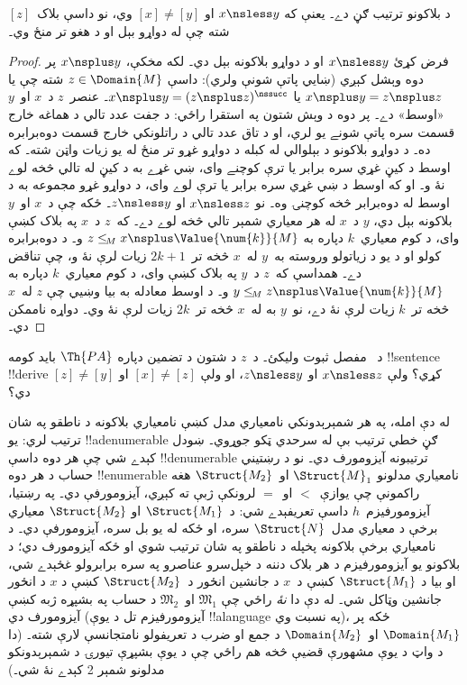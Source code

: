 \documentclass[../../../include/open-logic-section]{subfiles}
\begin{document}
\begin{prop}
د بلاکونو ترتيب ګڼ دے۔ يعنې که $x\nsless y$ او $[x]\neq[y]$ وي،
نو داسې بلاک~$[z]$ شته چې له دواړو بېل او د هغو تر منځ وي۔
\end{prop}

\begin{proof}
فرض کړئ $x\nsless y$ او د دواړو بلاکونه بېل دي۔ لکه مخکې، $x\nsplus y$ پر دوه وېشل کېږي
(ښايي پاتې شونې ولري): داسې $z\in\Domain{M}$ شته چې يا
$x \nsplus y = z \nsplus z$ يا
$x \nsplus y = (z \nsplus z)^\nssucc$۔ عنصر~$z$ د~$x$ او~$y$
«اوسط» دے۔ پر دوه د وېش شتون په استقرا راځي: د جفت عدد تالي د هماغه خارج قسمت سره پاتې شونے يو لري، او د تاق عدد تالي د راتلونکي خارج قسمت دوه‌برابره ده۔ د دواړو بلاکونو د بېلوالي له کبله د دواړو غړو تر منځ له يو زيات واټن شته۔ که اوسط د کيڼ غړي سره برابر يا ترې کوچنے وای، ښي غړے به د کيڼ له تالي څخه لوے نۀ و۔ او که اوسط د ښي غړي سره برابر يا ترې لوے وای، د دواړو غړو مجموعه به د اوسط له دوه‌برابر څخه کوچنۍ وه۔ نو $x\nsless z$ او $z\nsless y$۔ ځکه چې د~$x$ او~$y$ بلاکونه بېل دي، $y$ د~$x$ له هر معياري شمېر تالي څخه لوے دے۔ که~$z$ د~$x$ په بلاک کښې وای، د کوم معياري~$k$ دپاره به $z \mathrel{\leq_{\!M}} x \nsplus \Value{\num{k}}{M}$ و۔ د دوه‌برابره کولو او د يو د زياتولو وروسته به~$y$ له~$x$ څخه تر~$2k+1$ زيات لرې نۀ و، چې تناقض دے۔ همداسې که~$z$ د~$y$ په بلاک کښې وای، د کوم معياري~$k$ دپاره به $y \mathrel{\leq_{\!M}} z \nsplus \Value{\num{k}}{M}$ و۔ د اوسط معادله به بيا وښيي چې $z$ له~$x$ څخه تر~$k$ زيات لرې نۀ دے، نو~$y$ به له~$x$ څخه تر~$2k$ زيات لرې نۀ وي۔ دواړه ناممکن دي۔
\end{proof}

\begin{prob}
د~ مفصل ثبوت وليکئ۔
د~$z$ د شتون د تضمين دپاره $\Th{PA}$ بايد کومه !!{sentence}
!!{derive} کړي؟ ولې $x\nsless z$ او $z\nsless y$، او ولې
$[x]\neq[z]$ او $[z]\neq[y]$ دي؟
\end{prob}

\begin{explain}
له دې امله، په هر شمېرېدونکي نامعياري مدل کښې نامعياري بلاکونه د
ناطقو په شان ترتيب لري: يو !!a{denumerable} ګڼ خطي ترتيب بې له
سرحدي ټکو جوړوي۔ ښودل کېدے شي چې هر دوه داسې !!{denumerable}
ترتيبونه آيزومورف دي۔ نو د رښتيني حساب د هر دوه !!{enumerable}
نامعياري مدلونو $\Struct{M}_1$ او~$\Struct{M_2}$ هغه راکمونې چې
يوازې~$<$ او~$=$ لرونکې ژبې ته کېږي، آيزومورفې دي۔ په رښتيا،
آيزومورفيزم~$h$ داسې تعريفېدے شي: د~$\Struct{M_1}$ او
$\Struct{M_2}$ معياري برخې د معياري مدل~$\Struct{N}$ سره، او ځکه له
يو بل سره، آيزومورفې دي۔ د نامعياري برخې بلاکونه پخپله د ناطقو په
شان ترتيب شوي او ځکه آيزومورف دي؛ د بلاکونو يو آيزومورفيزم د هر
بلاک دننه د خپل‌سرو عناصرو په سره برابرولو غځېدے شي، او بيا د
$\Struct{M_1}$ کښې د~$x$ د جانشين انځور د~$\Struct{M_2}$ کښې د
$x$ د انځور جانشين وټاکل شي۔ له دې دا \emph{نۀ} راځي چې
$\mathfrak{M}_1$ او~$\mathfrak{M}_2$ د حساب په بشپړه ژبه کښې
آيزومورف دي (آيزومورفيزم تل د يوې !!a{language} په نسبت وي)، ځکه پر
$\Domain{M_1}$ او~$\Domain{M_2}$ د جمع او ضرب د تعريفولو نامتجانسې
لارې شته۔ (دا د واټ د يوې مشهورې قضيې څخه هم راځي چې د يوې بشپړې
تيورۍ د شمېرېدونکو مدلونو شمېر 2 کېدے نۀ شي۔)
\end{explain}
\end{document}
